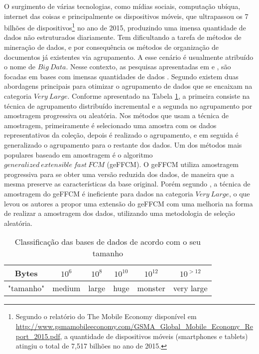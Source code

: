 O surgimento de várias tecnologias, como mídias sociais, computação ubíqua, internet das coisas e
principalmente os dispositivos móveis, que ultrapassou os 7 bilhões de dispositivos\footnote{Segundo
  o relatório do The Mobile Economy disponível em
  \url{http://www.gsmamobileeconomy.com/GSMA_Global_Mobile_Economy_Report_2015.pdf}, a quantidade de
dispositivos móveis (smartphones e tablets) atingiu o total de 7,517 bilhões no ano de 2015.} no ano
de 2015, produzindo uma imensa quantidade de dados não estruturados diariamente. Tem dificultando a
tarefa de métodos de mineração de dados, e por consequência os métodos de organização de documentos
já existentes via agrupamento. A esse cenário é usualmente atribuído o nome de $Big\ Data$. Nesse
contexto, as pesquisas apresentadas em  e , são focadas
em bases com imensas quantidades de dados . Segundo  existem duas abordagens
principais para otimizar o agrupamento de dados que se encaixam na categoria $Very\ Large$. Conforme
apresentado na Tabela \ref{table:datasize}, a primeira consiste na técnica de agrupamento
distribuído incremental e a segunda no agrupamento por amostragem progressiva ou aleatória. Nos
métodos que usam a técnica de amostragem, primeiramente é selecionado uma amostra com os dados
representativos da coleção, depois é realizado o agrupamento, e em seguida é generalizado o
agrupamento para o restante dos dados. Um dos métodos mais populares baseado em amostragem é o
algoritmo $generalized\ extensible\ fast\ FCM$ (geFFCM)\cite{Havens2012}. O geFFCM utiliza
amostragem progressiva para se obter uma versão reduzida dos dados, de maneira que a mesma preserve
as características da base original. Porém segundo , a técnica de amostragem
do geFFCM é ineficiente para dados na categoria $Very\ Large$, o que levou os autores a propor uma
extensão do geFFCM com uma melhoria na forma de realizar a amostragem dos dados, utilizando uma
metodologia de seleção aleatória.

\begin{table}[!htp]
  \centering
  \begin{tabular}{ |c|c c c c c|}
    \hline
    Bytes & $10^6$ & $10^8$ & $10^{10}$ & $10^{12}$ & $10^{>12}$ \\
    \hline
    "tamanho" & medium & large & huge & monster & very large \\
    \hline
  \end{tabular}
  \caption{Classificação das bases de dados de acordo com o seu tamanho \cite{Havens2012}}
  \label{table:datasize}
\end{table}

